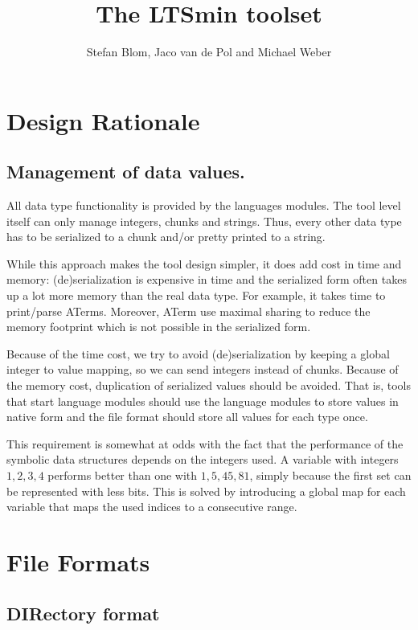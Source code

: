 \documentclass{report}
\title{The LTSmin toolset}
\author{Stefan Blom, Jaco van de Pol and Michael Weber}
\theoremstyle{plain}
\begin{document}
\maketitle

\tableofcontents


\chapter{Design Rationale}

\section{Management of data values.}

All data type functionality is provided by the languages modules.
The tool level itself can only manage integers, chunks and strings.
Thus, every other data type has to be serialized to a chunk
and/or pretty printed to a string.

While this approach makes the tool design simpler, it does add cost
in time and memory: (de)serialization is expensive in time and the
serialized form often takes up a lot more memory than the real data
type. For example, it takes time to print/parse ATerms. Moreover,
ATerm use maximal sharing to reduce the memory footprint which is not
possible in the serialized form.

Because of the time cost, we try to avoid (de)serialization by
keeping a global integer to value mapping, so we can send integers
instead of chunks. Because of the memory cost, duplication of
serialized values should be avoided. That is, tools that start language
modules should use the language modules to store values in native form
and the file format should store all values for each type once.

This requirement is somewhat at odds with the fact that the performance
of the symbolic data structures depends on the integers used.
A variable with integers $1,2,3,4$ performs better than one with
$1,5,45,81$, simply because the first set can be represented with less bits.
This is solved by introducing a global map for each variable that maps
the used indices to a consecutive range.



\chapter{File Formats}

\section{DIRectory format}
\end{document}
